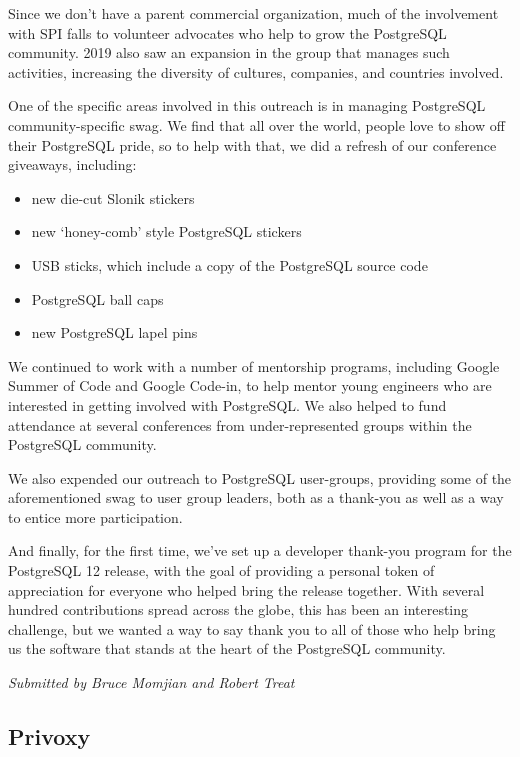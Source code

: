 \documentclass[a4paper]{report}
\begin{document}
Since we don't have a parent commercial organization, much of the
involvement with SPI falls to volunteer advocates who help to grow the
PostgreSQL community. 2019 also saw an expansion in the group that
manages such activities, increasing the diversity of cultures,
companies, and countries involved.

One of the specific areas involved in this outreach is in managing
PostgreSQL community-specific swag. We find that all over the world,
people love to show off their PostgreSQL pride, so to help with that, we
did a refresh of our conference giveaways, including:

\begin{itemize}

\item new die-cut Slonik stickers
\item new `honey-comb' style PostgreSQL stickers
\item USB sticks, which include a copy of the PostgreSQL source code
\item PostgreSQL ball caps
\item new PostgreSQL lapel pins

\end{itemize}

We continued to work with a number of mentorship programs, including
Google Summer of Code and Google Code-in, to help mentor young engineers
who are interested in getting involved with PostgreSQL. We also helped
to fund attendance at several conferences from under-represented groups
within the PostgreSQL community.

We also expended our outreach to PostgreSQL user-groups, providing some
of the aforementioned swag to user group leaders, both as a thank-you as
well as a way to entice more participation.

And finally, for the first time, we've set up a developer thank-you
program for the PostgreSQL 12 release, with the goal of providing a
personal token of appreciation for everyone who helped bring the release
together. With several hundred contributions spread across the globe,
this has been an interesting challenge, but we wanted a way to say thank
you to all of those who help bring us the software that stands at the
heart of the PostgreSQL community.

{\em Submitted by Bruce Momjian and Robert Treat}

\subsection{Privoxy}
\end{document}
